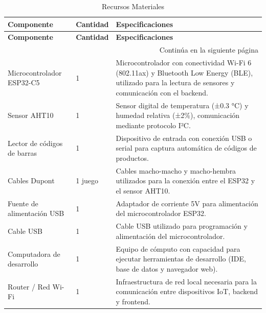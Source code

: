 \begin{longtable}{|p{3.5cm}|p{2.5cm}|p{8cm}|}

\caption{Recursos Materiales} \label{tab:recursos_materiales} \\

\hline
\rowcolor{gray!20}
\textbf{Componente} & \textbf{Cantidad} & \textbf{Especificaciones} \\
\hline
\endfirsthead

\hline
\rowcolor{gray!20}
\textbf{Componente} & \textbf{Cantidad} & \textbf{Especificaciones} \\
\hline
\endhead

\hline
\multicolumn{3}{|r|}{\small Continúa en la siguiente página} \\
\hline
\endfoot

\hline
\endlastfoot

Microcontrolador ESP32-C5 & 1 & Microcontrolador con conectividad Wi-Fi 6 (802.11ax) y Bluetooth Low Energy (BLE), utilizado para la lectura de sensores y comunicación con el backend. \\
\hline

Sensor AHT10 & 1 & Sensor digital de temperatura (±0.3 °C) y humedad relativa (±2\%), comunicación mediante protocolo I²C. \\
\hline

Lector de códigos de barras & 1 & Dispositivo de entrada con conexión USB o serial para captura automática de códigos de productos. \\
\hline

Cables Dupont & 1 juego & Cables macho-macho y macho-hembra utilizados para la conexión entre el ESP32 y el sensor AHT10. \\
\hline

Fuente de alimentación USB & 1 & Adaptador de corriente 5V para alimentación del microcontrolador ESP32. \\
\hline

Cable USB & 1 & Cable USB utilizado para programación y alimentación del microcontrolador. \\
\hline

Computadora de desarrollo & 1 & Equipo de cómputo con capacidad para ejecutar herramientas de desarrollo (IDE, base de datos y navegador web). \\
\hline

Router / Red Wi-Fi & 1 & Infraestructura de red local necesaria para la comunicación entre dispositivos IoT, backend y frontend. \\
\hline

\end{longtable}









